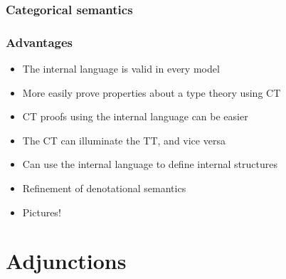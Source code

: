 \documentclass[
xcolor={usenames,dvipsnames,svgnames},
]{beamer}
\begin{document}
  \begin{frame}[fragile]
    \frametitle{Categorical semantics}

    \begin{center}


    \end{center}

  \end{frame}

  \begin{frame}
    \frametitle{Advantages}

    \begin{itemize}
      \item The internal language is valid in every model
      \item More easily prove properties about a type theory using CT
      \item CT proofs using the internal language can be easier
      \item The CT can illuminate the TT, and vice versa
      \item Can use the internal language to define internal structures
      \item Refinement of denotational semantics
      \item Pictures!
    \end{itemize}
  \end{frame}

  \section{Adjunctions}
\end{document}
